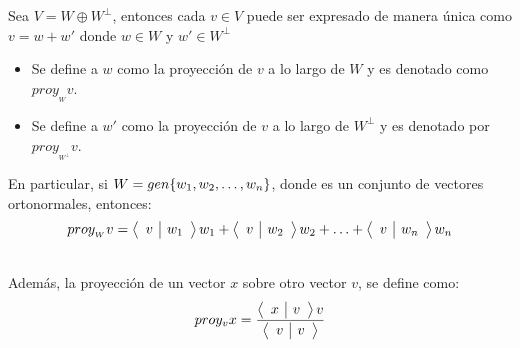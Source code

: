 \begin{dfn}
Sea $V = W \oplus W^\perp$, entonces cada $v \in V$ puede ser expresado de manera única como $v = w + w'$ donde $w \in W$ y $w' \in W^\perp$
\begin{itemize}
    \item Se define a $w$ como la proyección de $v$ a lo largo de $W$ y es denotado como $proy_{_W} v$.
    \item Se define a $w'$ como la proyección de $v$ a lo largo de $W^\perp$ y es denotado por $proy_{_{W^\perp}}v$.
\end{itemize}
En particular, si $W = gen \lbrace w_1, w_2, \ldots, w_n \rbrace$, donde  es un conjunto de vectores ortonormales, entonces:
$$proy_{_W} v = \left\langle \begin{array}{c|c} v & w_1 \end{array}\right\rangle w_1 + \left\langle \begin{array}{c|c} v & w_2 \end{array}\right\rangle w_2 + \hdots + \left\langle \begin{array}{c|c} v & w_n \end{array}\right\rangle w_n$$

~\\Además, la proyección de un vector $x$ sobre otro vector $v$, se define como:
$$proy_v x = \frac{\left\langle \begin{array}{c|c} x & v \end{array}\right\rangle v}{\left\langle \begin{array}{c|c} v & v \end{array}\right\rangle}$$
\end{dfn}

